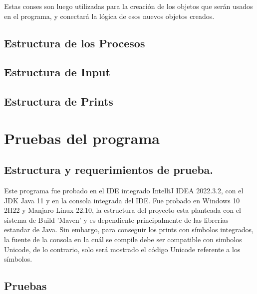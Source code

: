 \documentclass[a4paper]{article}
\begin{document}
    Estas conses son luego utilizadas para la creación de los objetos
    que serán usados en el programa, y conectará la lógica de esos
    nuevos objetos creados. 

    \subsection{Estructura de los Procesos}
    
    \subsection{Estructura de Input}
    
    \subsection{Estructura de Prints}
    

\section{Pruebas del programa}

\subsection{Estructura y requerimientos de prueba.}
Este programa fue probado en el IDE integrado IntelliJ IDEA 2022.3.2, con
el JDK Java 11 y en la consola integrada del IDE. Fue probado en Windows 10 
2H22 y Manjaro Linux 22.10, la estructura del proyecto esta planteada con el
sistema de Build 'Maven' y es dependiente principalmente de las librerías estandar
de Java. Sin embargo, para conseguir los prints con símbolos integrados, la fuente
de la consola en la cuál se compile debe ser compatible con simbolos Unicode,
de lo contrario, solo será mostrado el código Unicode referente a los símbolos.

\subsection{Pruebas}
\end{document}
